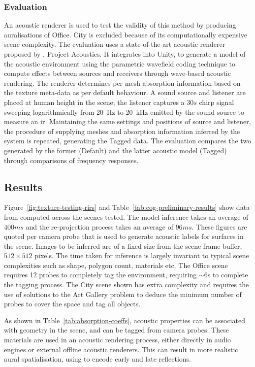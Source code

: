 \subsubsection{Evaluation}
An acoustic renderer is used to test the validity of this method by producing auralisations of Office. City is excluded because of its computationally expensive scene complexity. The evaluation uses a state-of-the-art acoustic renderer proposed by \cite{raghuvanshi2014parametric}, Project Acoustics. It integrates into Unity, to generate a model of the acoustic environment using the parametric wavefield coding technique to compute effects between sources and receivers through wave-based acoustic rendering. The renderer determines per-mesh absorption information based on the texture meta-data as per default behaviour. A sound source and listener are placed at human height in the scene; the listener captures a $30s$ chirp signal sweeping logarithmically from \qty{20}{\Hz} to \qty{20}{\kHz} emitted by the sound source to measure an \acrshort{ir}. Maintaining the same settings and positions of source and listener, the procedure of supplying meshes and absorption information inferred by the system is repeated, generating the Tagged data. The evaluation compares the two  generated by the former (Default) and the latter acoustic model (Tagged) through comparisons of frequency responses.

\subsection{Results}
Figure~\ref{fig:texture-testing-rirs} and Table~\ref{tab:cog-preliminary-results} show data from computed  across the scenes tested.
The model inference takes an average of $400 ms$ and the re-projection process takes an average of $96ms$. These figures are quoted per camera probe that is used to generate acoustic labels for surfaces in the scene. Images to be inferred are of a fixed size from the scene frame buffer, $512 \times 512$ pixels. The time taken for inference is largely invariant to typical scene complexities such as shape, polygon count, materials etc. The Office scene requires 12 probes to completely tag the environment, requiring $\sim$6s to complete the tagging process. The City scene shown has extra complexity and requires the use of solutions to the Art Gallery problem to deduce the minimum number of probes to cover the space and tag all objects.\par
As shown in Table~\ref{tab:absorption-coeffs}, acoustic properties can be associated with geometry in the scene, and can be tagged from camera probes. These materials are used in an acoustic rendering process, either directly in audio engines or external offline acoustic renderers. This can result in more realistic aural spatialisation, using  to encode early and late reflections.\par

